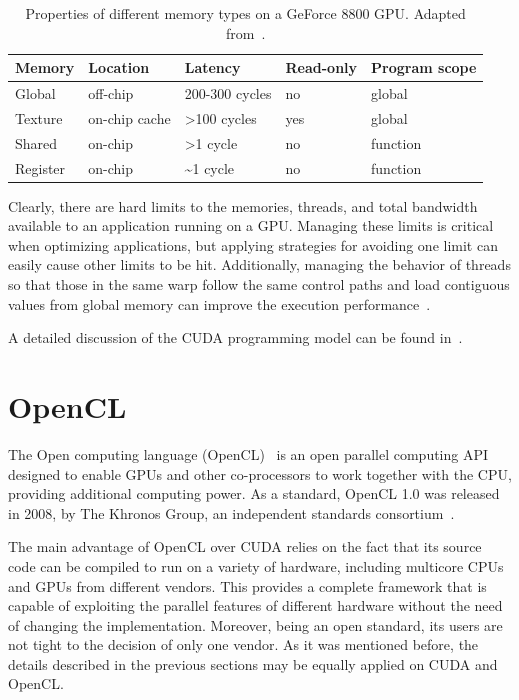\begin{table}
\caption{Properties of different memory types on a GeForce 8800 GPU. Adapted
from~\cite{Ryoo-Optimization_principles_of_a_GPU_using_CUDA:2008}.\label{tab:02-GPU_memory_properties}}


\centering

\begin{tabular}{lllll}
\hline 
Memory & Location & Latency & Read-only & Program scope\tabularnewline[\doublerulesep]
\hline 
Global & off-chip & 200-300 cycles & no & global\tabularnewline
Texture & on-chip cache & >100 cycles & yes & global\tabularnewline
Shared & on-chip & >1 cycle & no & function\tabularnewline
Register & on-chip & \textasciitilde{}1 cycle & no & function\tabularnewline
\hline 
\end{tabular}
\end{table}


Clearly, there are hard limits to the memories, threads, and total
bandwidth available to an application running on a GPU. Managing these
limits is critical when optimizing applications, but applying strategies
for avoiding one limit can easily cause other limits to be hit. Additionally,
managing the behavior of threads so that those in the same warp follow
the same control paths and load contiguous values from global memory
can improve the execution performance~\cite{Ryoo-Optimization_principles_of_a_GPU_using_CUDA:2008}.

A detailed discussion of the CUDA programming model can be found in~\cite{Farber-CUDA_application_design_and_development:2011}.


\section{OpenCL \label{sub:02-OpenCL}}

The Open computing language (OpenCL)~\cite{Stone_OpenCL.A.parallel.programming.standard:2010}
is an open parallel computing API designed to enable GPUs and other
co-processors to work together with the CPU, providing additional
computing power. As a standard, OpenCL 1.0 was released in 2008, by
The Khronos Group, an independent standards consortium~\cite{Munshi_The.OpenCL.specification:2009}.

The main advantage of OpenCL over CUDA relies on the fact that its
source code can be compiled to run on a variety of hardware, including
multicore CPUs and GPUs from different vendors. This provides a complete
framework that is capable of exploiting the parallel features of different
hardware without the need of changing the implementation. Moreover,
being an open standard, its users are not tight to the decision of
only one vendor. As it was mentioned before, the details described
in the previous sections may be equally applied on CUDA and OpenCL.

